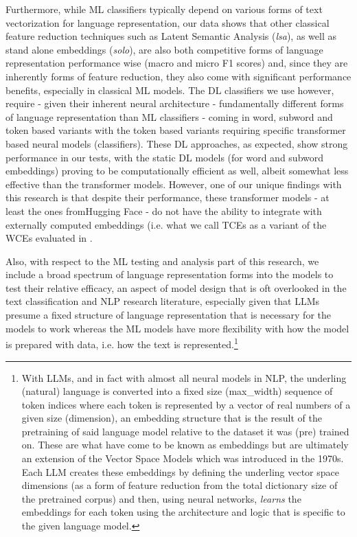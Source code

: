 \documentclass[final]{clv2025-revised}
\begin{document}
Furthermore, while ML classifiers typically depend on various forms of text vectorization for language representation, our data shows that other classical feature reduction techniques such as Latent Semantic Analysis (\textit{lsa}), as well as stand alone embeddings (\textit{solo}), are also both competitive forms of language representation performance wise (macro and micro F1 scores) and, since they are inherently forms of feature reduction, they also come with significant performance benefits, especially in classical ML models. The DL classifiers we use however, require - given their inherent neural architecture - fundamentally different forms of language representation than ML classifiers - coming in word, subword and token based variants with the token based variants requiring specific transformer based neural models (classifiers). These DL approaches, as expected, show strong performance in our tests, with the static DL models (for word and subword embeddings) proving to be computationally efficient as well, albeit somewhat less effective than the transformer models. However, one of our unique findings with this research is that despite their performance, these transformer models - at least the ones fromHugging Face - do not have the ability to integrate with externally computed embeddings (i.e. what we call TCEs as a variant of the WCEs evaluated in \cite{moreo2021}.

Also, with respect to the ML testing and analysis part of this research, we include a broad spectrum of language representation forms into the models to test their relative efficacy, an aspect of model design that is oft overlooked in the text classification and NLP research literature, especially given that LLMs presume a fixed structure of language representation that is necessary for the models to work whereas the ML models have more flexibility with how the model is prepared with data, i.e. how the text is represented.\footnote{With LLMs, and in fact with almost all neural models in NLP, the underling (natural) language is converted into a fixed size (max\_width) sequence of token indices where each token is represented by a vector of real numbers of a given size (dimension), an embedding structure that is the result of the pretraining of said language model relative to the dataset it was (pre) trained on. These are what have come to be known as embeddings but are ultimately an extension of the Vector Space Models which was introduced in the 1970s. Each LLM creates these embeddings by defining the underling vector space dimensions (as a form of feature reduction from the total dictionary size of the pretrained corpus) and then, using neural networks, \textit{learns} the embeddings for each token using the architecture and logic that is specific to the given language model.} 
\end{document}
